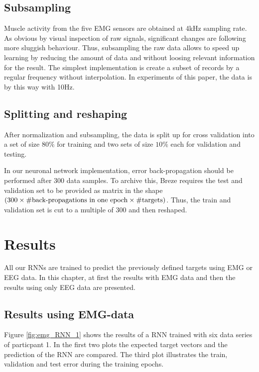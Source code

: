 \documentclass{article} %
\begin{document}
\subsection{Subsampling}
Muscle activity from the five EMG sensors are obtained at 4kHz sampling rate. As obvious by visual inspection of raw signals, significant changes are following more sluggish behaviour. Thus, subsampling the raw data allows to speed up learning by reducing the amount of data and without loosing relevant information for the result. The simplest implementation is create a subset of records by a regular frequency without interpolation. In experiments of this paper, the data is by this way with 10Hz.

\subsection{Splitting and reshaping}
After normalization and subsampling, the data is split up for cross validation into a set of size $80\%$ for training and two sets of size $10\%$ each for validation and testing.

In our neuronal network implementation, error back-propagation should be performed after 300 data samples.
To archive this, Breze requires the test and validation set to be provided as matrix in the shape $(300 \times \# \textnormal{back-propagations in one epoch} \times \# \textnormal{targets)}$.
Thus, the train and validation set is cut to a multiple of 300 and then reshaped.

\section{Results}
        
All our RNNs are trained to predict the previously defined targets using EMG or EEG data.
In this chapter, at first the results with EMG data and then the results using only EEG data are presented.
\subsection{Results using EMG-data}
Figure \ref{fig:emg_RNN_1} shows the results of a RNN trained with six data series of particpant 1.
In the first two plots the expected target vectors and the prediction of the RNN are compared.
The third plot illustrates the train, validation and test error during the training epochs.
\end{document}
